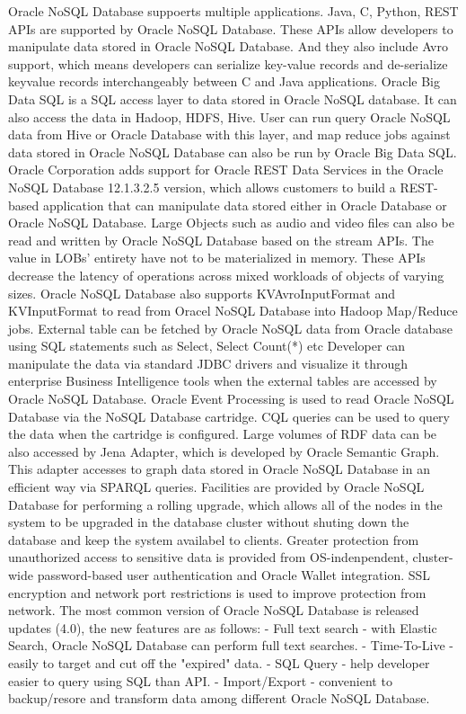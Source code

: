 Oracle NoSQL Database suppoerts multiple applications. 
Java, C, Python, REST APIs are supported by Oracle NoSQL Database. These APIs allow developers to manipulate data stored in Oracle NoSQL Database. And they also include Avro support, which means developers can serialize key-value records and de-serialize keyvalue records interchangeably between C and Java applications.\cite{hid-sp18-515-editor01}
Oracle Big Data SQL is a SQL access layer to data stored in Oracle NoSQL database. It can also access the data in Hadoop, HDFS, Hive. User can run query Oracle NoSQL data from Hive or Oracle Database with this layer, and map reduce jobs against data stored in Oracle NoSQL Database can also be run by Oracle Big Data SQL.\cite{hid-sp18-515-editor01}
Oracle Corporation adds support for Oracle REST Data Services in the Oracle NoSQL Database 12.1.3.2.5 version, which allows customers to build a REST-based application that can manipulate data stored either in Oracle Database or Oracle NoSQL Database. \cite{hid-sp18-515-editor01}
Large Objects such as audio and video files can also be read and written by Oracle NoSQL Database based on the stream APIs. The value in LOBs' entirety have not to be materialized in memory. These APIs decrease the latency of operations across mixed workloads of objects of varying sizes. \cite{hid-sp18-515-editor01}
Oracle NoSQL Database also supports KVAvroInputFormat and KVInputFormat to read from Oracel NoSQL Database into Hadoop Map/Reduce jobs. \cite{hid-sp18-515-editor01}
External table can be fetched by Oracle NoSQL data from Oracle database using SQL statements such as Select, Select Count(*) etc Developer can manipulate the data via standard JDBC drivers and visualize it through enterprise Business Intelligence tools when the external tables are accessed by Oracle NoSQL Database. \cite{hid-sp18-515-editor01}
Oracle Event Processing is used to read Oracle NoSQL Database via the NoSQL Database cartridge. CQL queries can be used to query the data when the cartridge is configured. Large volumes of RDF data can be also accessed by Jena Adapter, which is developed by Oracle Semantic Graph. This adapter accesses to graph data stored in Oracle NoSQL Database in an efficient way via SPARQL queries. \cite{hid-sp18-515-editor01}
Facilities are provided by Oracle NoSQL Database for performing a rolling upgrade, which allows all of the nodes in the system to be upgraded in the database cluster without shuting down the database and keep the system availabel to clients. \cite{hid-sp18-515-editor01}
Greater protection from unauthorized access to sensitive data is provided from OS-indenpendent, cluster-wide password-based user authentication and Oracle Wallet integration. SSL encryption and network port restrictions is used to improve protection from network. \cite{hid-sp18-515-editor01}
The most common version of Oracle NoSQL Database is released updates (4.0), the new features are as follows:
- Full text search - with Elastic Search, Oracle NoSQL Database can perform full text searches.
- Time-To-Live - easily to target and cut off the "expired" data.
- SQL Query - help developer easier to query using SQL than API.
- Import/Export - convenient to backup/resore and transform data among different Oracle NoSQL Database. \cite{hid-sp18-515-editor00}

